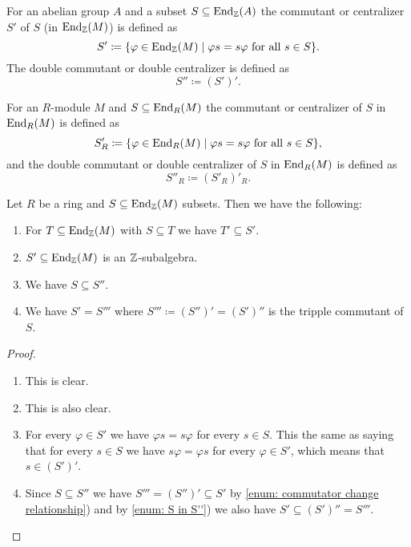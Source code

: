 \begin{defi}
 For an abelian group $A$ and a subset $S \subseteq \operatorname{End}_{\mathbb{Z}}(A)$ the commutant or centralizer $S'$ of $S$ (in $\operatorname{End}_{\mathbb{Z}}(M)$) is defined as
 \[
  S' \coloneqq \{ \varphi \in \operatorname{End}_{\mathbb{Z}}(M) \mid \varphi s = s \varphi \text{ for all } s \in S \}.
 \]
 The double commutant or double centralizer is defined as
 \[
  S'' \coloneqq (S')'.
 \]
 
 For an $R$-module $M$ and $S \subseteq \operatorname{End}_R(M)$ the commutant or centralizer of $S$ in $\operatorname{End}_R(M)$ is defined as
 \[
  S'_R \coloneqq \{ \varphi \in \operatorname{End}_R(M) \mid \varphi s = s \varphi \text{ for all } s \in S \},
 \]
 and the double commutant or double centralizer of $S$ in $\operatorname{End}_R(M)$ is defined as
 \[
  S''_R \coloneqq (S'_R)'_R.
 \]
\end{defi}


\begin{lem}
 Let $R$ be a ring and $S \subseteq \operatorname{End}_{\mathbb{Z}}(M)$ subsets. Then we have the following:
 \begin{enumerate}[label=\emph{\alph*)},leftmargin=*]
  \item \label{enum: commutator change relationship}
   For $T \subseteq \operatorname{End}_{\mathbb{Z}}(M)$ with $S \subseteq T$ we have $T' \subseteq S'$.
  \item
   $S' \subseteq \operatorname{End}_{\mathbb{Z}}(M)$ is an $\mathbb{Z}$-subalgebra.
  \item \label{enum: S in S''}
   We have $S \subseteq S''$. 
  \item
   We have $S' = S'''$ where $S''' \coloneqq (S'')' = (S')''$ is the tripple commutant of $S$.
 \end{enumerate}
\end{lem}
\begin{proof}
 \begin{enumerate}[label=\emph{\alph*)},leftmargin=*]
  \item
   This is clear.
  \item
   This is also clear.
  \item
   For every $\varphi \in S'$ we have $\varphi s = s \varphi$ for every $s \in S$. This the same as saying that for every $s \in S$ we have $s \varphi = \varphi s$ for every $\varphi \in S'$, which means that $s \in (S')'$.
  \item
   Since $S \subseteq S''$ we have $S''' = (S'')' \subseteq S'$ by \ref{enum: commutator change relationship}) and by \ref{enum: S in S''}) we also have $S' \subseteq (S')'' = S'''$.
  \qedhere
 \end{enumerate}
\end{proof}


